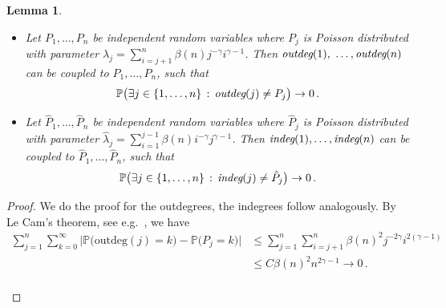 \documentclass[12pt,a4paper]{article}
\numberwithin{equation}{section}
\newtheorem{lemma}[shared]{Lemma}
\begin{document}
\begin{lemma}\label{outdeg}
\begin{itemize}
    \item[(a)]
    Let $P_1,\dots,P_n$ be independent random variables where $P_j$ is Poisson distributed with parameter $\lambda_j=\sum_{i=j+1}^n \beta(n) j^{-\gamma}i^{\gamma-1}$. Then $\emph{outdeg}(1),$ $\dots,\emph{outdeg}(n) $ can be coupled to $P_1,\dots,P_n$, such that
    $$ \mathbb P\big(\exists j\in\{1,\dots,n\}\,:\,\emph{outdeg}(j)\neq P_j\big)\to0\,.$$
\item[(b)]
    Let $\hat P_1,\dots,\hat P_n$ be independent random variables where $\hat P_j$ is Poisson distributed with parameter $\hat \lambda_j=\sum_{i=1}^{j-1} \beta(n) i^{-\gamma}j^{\gamma-1}$. Then $\emph{indeg}(1),\dots,\emph{indeg}(n) $ can be coupled to $\hat P_1,\dots, \hat P_n$, such that
    $$ \mathbb P\big(\exists j\in\{1,\dots,n\}\,:\,\emph{indeg}(j)\neq \hat P_j\big)\to0\,.$$
\end{itemize}    
\end{lemma}

\begin{proof}
We do the proof for the outdegrees, the indegrees follow analogously. By Le Cam's theorem, see e.g.\ \cite[(1.23)]{BHJ}, we have 
\begin{align*} \sum_{j=1}^n \sum_{k=0}^\infty \big| \mathbb P\big(\text{outdeg}(j)=k\big)-\mathbb P\big(P_j = k\big) \big| & \le  \sum_{j=1}^n \sum_{i=j+1}^n \beta(n)^2 j^{-2\gamma}i^{2(\gamma-1)} \\ & \le C \beta(n)^2 n^{2\gamma-1} \to 0 \, . 
\end{align*}\\[-14mm]
\end{proof}

\medskip
\end{document}
